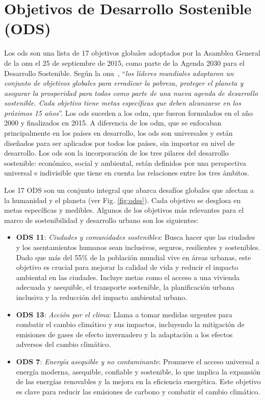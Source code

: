 \section{Objetivos de Desarrollo Sostenible (ODS)}
	Los \acrlong{ods} son una lista de 17 objetivos globales adoptados por la Asamblea General de la \acrfull{onu} el 25 de septiembre de 2015, como parte de la Agenda 2030 para el Desarrollo Sostenible. Según la \acrshort{onu}~\cite{un_sustainable_development}, ``\textit{los líderes mundiales adoptaron un conjunto de objetivos globales para erradicar la pobreza, proteger el planeta y asegurar la prosperidad para todos como parte de una nueva agenda de desarrollo sostenible. Cada objetivo tiene metas específicas que deben alcanzarse en los próximos 15 años}''.		
	Los \acrshort{ods} suceden a los \acrfull{odm}, que fueron formulados en el año 2000 y finalizados en 2015. A diferencia de los \acrshort{odm}, que se enfocaban principalmente en los países en desarrollo, los \acrshort{ods} son universales y están diseñados para ser aplicados por todos los países, sin importar su nivel de desarrollo. Los \acrlong{ods} son la incorporación de los tres pilares del desarrollo sostenible: económico, social y ambiental, están definidos por una perspectiva universal e indivisible que tiene en cuenta las relaciones entre los tres ámbitos.
		
	Los 17 ODS son un conjunto integral que abarca desafíos globales que afectan a la humanidad y el planeta (ver Fig. \ref{fig:odss}). Cada objetivo se desglosa en metas específicas y medibles. Algunos de los objetivos más relevantes para el marco de sostenibilidad y desarrollo urbano son los siguientes:
	\begin{itemize}
		\item \textbf{ODS 11}: \textit{Ciudades y comunidades sostenibles}: Busca hacer que las ciudades y los asentamientos humanos sean inclusivos, seguros, resilientes y sostenibles. Dado que más del 55\% de la población mundial vive en áreas urbanas, este objetivo es crucial para mejorar la calidad de vida y reducir el impacto ambiental en las ciudades. Incluye metas como el acceso a una vivienda adecuada y asequible, el transporte sostenible, la planificación urbana inclusiva y la reducción del impacto ambiental urbano.
		
		\item \textbf{ODS 13}: \textit{Acción por el clima}: Llama a tomar medidas urgentes para combatir el cambio climático y sus impactos, incluyendo la mitigación de emisiones de gases de efecto invernadero y la adaptación a los efectos adversos del cambio climático.
		
		\item \textbf{ODS 7}: \textit{Energía asequible y no contaminante}: Promueve el acceso universal a energía moderna, asequible, confiable y sostenible, lo que implica la expansión de las energías renovables y la mejora en la eficiencia energética. Este objetivo es clave para reducir las emisiones de carbono y combatir el cambio climático.
		
	\end{itemize}
	

